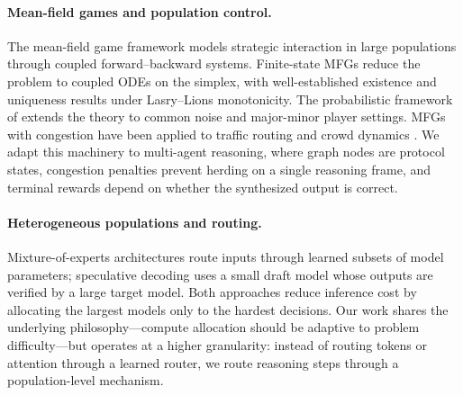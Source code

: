 \documentclass[11pt]{amsart}
\newcommand\1{{\mathds{1}}}
\theoremstyle{definition}
\theoremstyle{remark}
\numberwithin{equation}{section}
\begin{document}
\paragraph{Mean-field games and population control.}
The mean-field game framework \cite{LasryLions2007, HuangMalhameCaines2006} models strategic interaction in large populations through coupled forward--backward systems.
Finite-state MFGs \cite{Gomes2010, Gueant2015, Cecchin2019} reduce the problem to coupled ODEs on the simplex, with well-established existence and uniqueness results under Lasry--Lions monotonicity.
The probabilistic framework of \cite{CarmonaDelarue2018} extends the theory to common noise and major-minor player settings.
MFGs with congestion have been applied to traffic routing \cite{Achdou2020MFGTraffic} and crowd dynamics \cite{Lachapelle2011MFGCrowd}.
We adapt this machinery to multi-agent reasoning, where graph nodes are protocol states, congestion penalties prevent herding on a single reasoning frame, and terminal rewards depend on whether the synthesized output is correct.

\paragraph{Heterogeneous populations and routing.}
Mixture-of-experts architectures \cite{Shazeer2017MoE} route inputs through learned subsets of model parameters; speculative decoding \cite{Leviathan2023Speculative} uses a small draft model whose outputs are verified by a large target model.
Both approaches reduce inference cost by allocating the largest models only to the hardest decisions.
Our work shares the underlying philosophy---compute allocation should be adaptive to problem difficulty---but operates at a higher granularity: instead of routing tokens or attention through a learned router, we route reasoning steps through a population-level mechanism.
\end{document}
